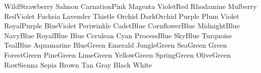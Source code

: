 \newColor WildStrawberry  %
\newColor Salmon	  %
\newColor CarnationPink	  %
\newColor Magenta	  %
\newColor VioletRed	  %
\newColor Rhodamine	  %
\newColor Mulberry	  %
\newColor RedViolet	  %
\newColor Fuchsia	  %
\newColor Lavender	  %
\newColor Thistle	  %
\newColor Orchid	  %
\newColor DarkOrchid	  %
\newColor Purple	  %
\newColor Plum		  %
\newColor Violet	  %
\newColor RoyalPurple	  %
\newColor BlueViolet	  %
\newColor Periwinkle	  %
\newColor CadetBlue	  %
\newColor CornflowerBlue  %
\newColor MidnightBlue	  %
\newColor NavyBlue	  %
\newColor RoyalBlue	  %
\newColor Blue		  %
\newColor Cerulean	  %
\newColor Cyan		  %
\newColor ProcessBlue	  %
\newColor SkyBlue	  %
\newColor Turquoise	  %
\newColor TealBlue	  %
\newColor Aquamarine	  %
\newColor BlueGreen	  %
\newColor Emerald	  %
\newColor JungleGreen	  %
\newColor SeaGreen	  %
\newColor Green		  %
\newColor ForestGreen	  %
\newColor PineGreen	  %
\newColor LimeGreen	  %
\newColor YellowGreen	  %
\newColor SpringGreen	  %
\newColor OliveGreen	  %
\newColor RawSienna	  %
\newColor Sepia		  %
\newColor Brown		  %
\newColor Tan		  %
\newColor Gray		  %
\newColor Black		  %
\newColor White		  %


